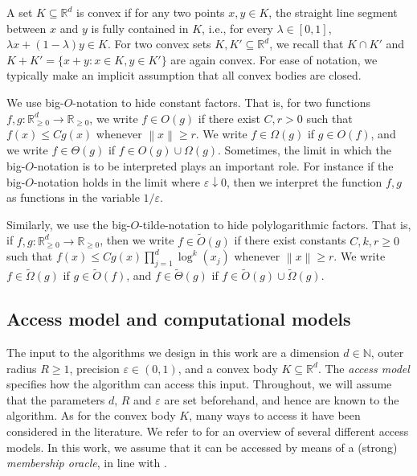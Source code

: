 \documentclass[11pt]{article}
\newcommand{\N}{\ensuremath{\mathbb{N}}}
\newcommand{\R}{\ensuremath{\mathbb{R}}}
\newcommand{\norm}[1]{\ensuremath{\left\|#1\right\|}}
\begin{document}
    A set $K \subseteq \R^d$ is convex if for any two points $x,y \in K$, the straight line segment between $x$ and $y$ is fully contained in $K$, i.e., for every $\lambda \in [0,1]$, $\lambda x + (1-\lambda)y \in K$. For two convex sets $K,K' \subseteq \R^d$, we recall that $K \cap K'$ and $K + K' = \{x+y : x \in K, y \in K'\}$ are again convex. For ease of notation, we typically make an implicit assumption that all convex bodies are closed.

    We use big-$O$-notation to hide constant factors. That is, for two functions $f,g : \R_{\geq 0}^d \to \R_{\geq 0}$, we write $f \in O(g)$ if there exist $C,r > 0$ such that $f(x) \leq Cg(x)$ whenever $\norm{x} \geq r$. We write $f \in \Omega(g)$ if $g \in O(f)$, and we write $f \in \Theta(g)$ if $f \in O(g) \cup \Omega(g)$. Sometimes, the limit in which the big-$O$-notation is to be interpreted plays an important role. For instance if the big-$O$-notation holds in the limit where $\varepsilon \downarrow 0$, then we interpret the function $f,g$ as functions in the variable $1/\varepsilon$.

    Similarly, we use the big-$O$-tilde-notation to hide polylogarithmic factors. That is, if $f,g : \R_{\geq 0}^d \to \R_{\geq 0}$, then we write $f \in \widetilde{O}(g)$ if there exist constants $C,k,r \geq 0$ such that $f(x) \leq Cg(x)\prod_{j=1}^d\log^k(x_j)$ whenever $\norm{x} \geq r$. We write $f \in \widetilde{\Omega}(g)$ if $g \in \widetilde{O}(f)$, and $f \in \widetilde{\Theta}(g)$ if $f \in \widetilde{O}(g) \cup \widetilde{\Omega}(g)$.

    \subsection{Access model and computational models}

    The input to the algorithms we design in this work are a dimension $d \in \N$, outer radius $R \geq 1$, precision $\varepsilon \in (0,1)$, and a convex body $K \subseteq \R^d$. The \textit{access model} specifies how the algorithm can access this input. Throughout, we will assume that the parameters $d$, $R$ and $\varepsilon$ are set beforehand, and hence are known to the algorithm. As for the convex body $K$, many ways to access it have been considered in the literature. We refer to \cite[Chapter~2]{grotschel2012geometric} for an overview of several different access models. In this work, we assume that it can be accessed by means of a (strong) \textit{membership oracle}, in line with \cite[Definition~2.1.5]{grotschel2012geometric}.
\end{document}

